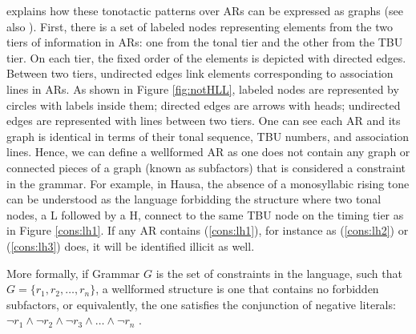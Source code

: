 \documentclass[11pt,letterpaper]{article}
\begin{document}
\cite{jardineLocalNatureToneassociation2017} explains how these tonotactic patterns over ARs can be expressed as graphs (see also \cite{coleman1991no, jardine-heinz-2015-concatenation}). First, there is a set of labeled nodes representing elements from the two tiers of information in ARs: one from the tonal tier and the other from the TBU tier. On each tier, the fixed order of the elements is depicted with directed edges. Between two tiers, undirected edges link elements corresponding to association lines in ARs. As shown in Figure \ref{fig:notHLL}, labeled nodes are represented by circles with labels inside them; directed edges are arrows with heads; undirected edges are represented with lines between two tiers. One can see each AR and its graph is identical in terms of their tonal sequence, TBU numbers, and association lines. Hence, we can define a wellformed AR as one does not contain any graph or connected pieces of a graph (known as subfactors) that is considered a constraint in the grammar. For example, in Hausa, the absence of a monosyllabic rising tone can be understood as the language forbidding the structure where two tonal nodes, a L followed by a H, connect to the same TBU node on the timing tier as in Figure \ref{cons:lh1}. If any AR contains (\ref{cons:lh1}), for instance as (\ref{cons:lh2}) or (\ref{cons:lh3}) does, it will be identified illicit as well. 

More formally, if Grammar $G$ is the set of constraints
 in the language, such that $G = \{r_1, r_2, \ldots, r_n\}$, a wellformed structure is one that contains no forbidden subfactors, or equivalently, the one satisfies the conjunction of negative literals: $\lnot r_1 \land \lnot r_2 \land \lnot r_3 \land \ldots \land \lnot r_n$ \citep{jardineLocalNatureToneassociation2017, rogers2019extracting}. 
\end{document}
